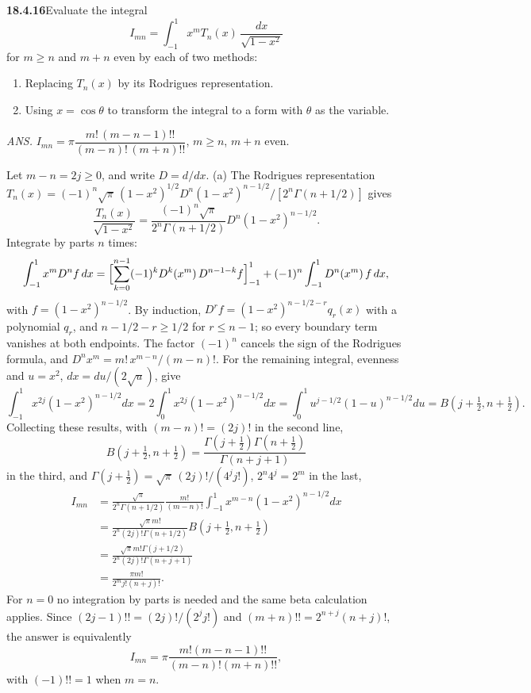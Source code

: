 \par\bigskip
\noindent\textbf{18.4.16}\quad Evaluate the integral
\[
I_{mn}=\int_{-1}^{1}x^{m}T_{n}(x)\,\frac{dx}{\sqrt{1-x^{2}}}
\]
for $m\ge n$ and $m+n$ even by each of two methods:
\begin{enumerate}
\item[(a)] Replacing $T_{n}(x)$ by its Rodrigues representation.
\item[(b)] Using $x=\cos\theta$ to transform the integral to a form
with $\theta$ as the variable.
\end{enumerate}
\par\nobreak\hfill\emph{ANS.}\enspace
$I_{mn}=\pi\dfrac{m!\,(m-n-1)!!}{(m-n)!\,(m+n)!!}$,\qquad
$m\ge n$, $m+n$ even.
\solution
{}\par

Let $m-n=2j\ge0$, and write $D=d/dx$.
(a) The Rodrigues representation
$T_n(x)=(-1)^n\sqrt\pi\,(1-x^2)^{1/2}D^n(1-x^2)^{n-1/2}/[2^n\Gamma(n+1/2)]$
gives
\[
\frac{T_n(x)}{\sqrt{1-x^2}}
 =\frac{(-1)^n\sqrt\pi}{2^n\Gamma(n+1/2)}
    D^n(1-x^2)^{n-1/2}.
\]
Integrate by parts $n$ times:
\[
\int_{-1}^1x^mD^nf\,dx
 =\Bigl[\sum_{k=0}^{n-1}(-1)^kD^k(x^m)\,D^{n-1-k}f\Bigr]_{-1}^1
  +(-1)^n\int_{-1}^1D^n(x^m)\,f\,dx,
\]
with $f=(1-x^2)^{n-1/2}$.  By induction,
$D^rf=(1-x^2)^{n-1/2-r}q_r(x)$ with a polynomial $q_r$, and
$n-1/2-r\ge1/2$ for $r\le n-1$; so every boundary term vanishes at
both endpoints.  The factor $(-1)^n$ cancels the sign of the
Rodrigues formula, and $D^nx^m=m!\,x^{m-n}/(m-n)!$.  For the remaining
integral, evenness and $u=x^2$, $dx=du/(2\sqrt u)$, give
\[
\int_{-1}^1x^{2j}(1-x^2)^{n-1/2}dx
 =2\int_0^1x^{2j}(1-x^2)^{n-1/2}dx
 =\int_0^1u^{j-1/2}(1-u)^{n-1/2}du
 =B(j+\tfrac12,n+\tfrac12).
\]
Collecting these results, with $(m-n)!=(2j)!$ in the second line,
\[
B(j+\tfrac12,n+\tfrac12)
 =\frac{\Gamma(j+\frac12)\Gamma(n+\frac12)}{\Gamma(n+j+1)}
\]
in the third, and
$\Gamma(j+\frac12)=\sqrt\pi\,(2j)!/(4^jj!)$, $2^n4^j=2^m$ in the last,
\begin{align*}
I_{mn}
 &=\frac{\sqrt\pi}{2^n\Gamma(n+1/2)}
   \frac{m!}{(m-n)!}
   \int_{-1}^1x^{m-n}(1-x^2)^{n-1/2}dx\\
 &=\frac{\sqrt\pi m!}{2^n(2j)!\Gamma(n+1/2)}
   B(j+\tfrac12,n+\tfrac12)\\
 &=\frac{\sqrt\pi m!\Gamma(j+1/2)}{2^n(2j)!\Gamma(n+j+1)}\\
 &=\boxed{\frac{\pi m!}{2^m j!(n+j)!}}.
\end{align*}
For $n=0$ no integration by parts is needed and the same beta
calculation applies.  Since
$(2j-1)!!=(2j)!/(2^jj!)$ and
$(m+n)!!=2^{n+j}(n+j)!$, the answer is equivalently
\[
\boxed{I_{mn}=\pi\frac{m!(m-n-1)!!}{(m-n)!(m+n)!!}},
\]
with $(-1)!!=1$ when $m=n$.

